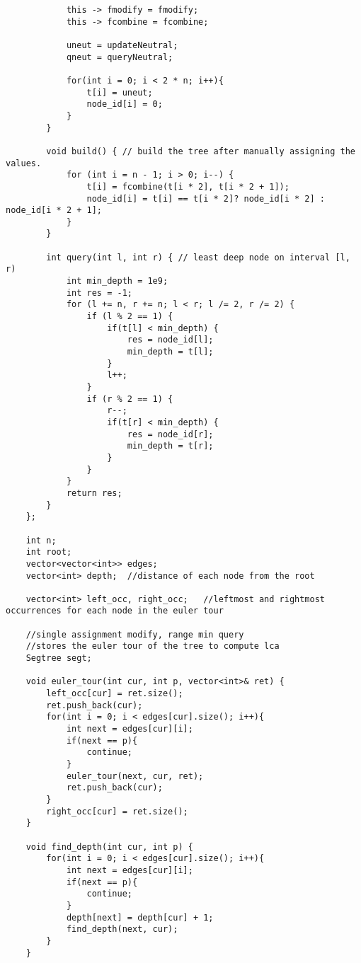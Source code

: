 \documentclass[8pt, headheight=10pt]{scrartcl}
\begin{document}
\begin{multicols*}{3}
\begin{lstlisting}
            this -> fmodify = fmodify;
            this -> fcombine = fcombine;

            uneut = updateNeutral;
            qneut = queryNeutral;

            for(int i = 0; i < 2 * n; i++){
                t[i] = uneut;
                node_id[i] = 0;
            }
        }

        void build() { // build the tree after manually assigning the values.
            for (int i = n - 1; i > 0; i--) {   
                t[i] = fcombine(t[i * 2], t[i * 2 + 1]);
                node_id[i] = t[i] == t[i * 2]? node_id[i * 2] : node_id[i * 2 + 1];
            }
        }

        int query(int l, int r) { // least deep node on interval [l, r)
            int min_depth = 1e9;
            int res = -1;
            for (l += n, r += n; l < r; l /= 2, r /= 2) {
                if (l % 2 == 1) {
                    if(t[l] < min_depth) {
                        res = node_id[l];
                        min_depth = t[l];
                    }
                    l++;
                }
                if (r % 2 == 1) {
                    r--;
                    if(t[r] < min_depth) {
                        res = node_id[r];
                        min_depth = t[r];
                    }
                }
            }
            return res;
        }
    };

    int n;
    int root;
    vector<vector<int>> edges;
    vector<int> depth;  //distance of each node from the root

    vector<int> left_occ, right_occ;   //leftmost and rightmost occurrences for each node in the euler tour
    
    //single assignment modify, range min query
    //stores the euler tour of the tree to compute lca
    Segtree segt;

    void euler_tour(int cur, int p, vector<int>& ret) {
        left_occ[cur] = ret.size();
        ret.push_back(cur);
        for(int i = 0; i < edges[cur].size(); i++){
            int next = edges[cur][i];
            if(next == p){
                continue;
            }
            euler_tour(next, cur, ret);
            ret.push_back(cur);
        }
        right_occ[cur] = ret.size();
    }

    void find_depth(int cur, int p) {
        for(int i = 0; i < edges[cur].size(); i++){
            int next = edges[cur][i];
            if(next == p){
                continue;
            }
            depth[next] = depth[cur] + 1;
            find_depth(next, cur);
        }
    }


\end{lstlisting}
\end{multicols*}
\end{document}
